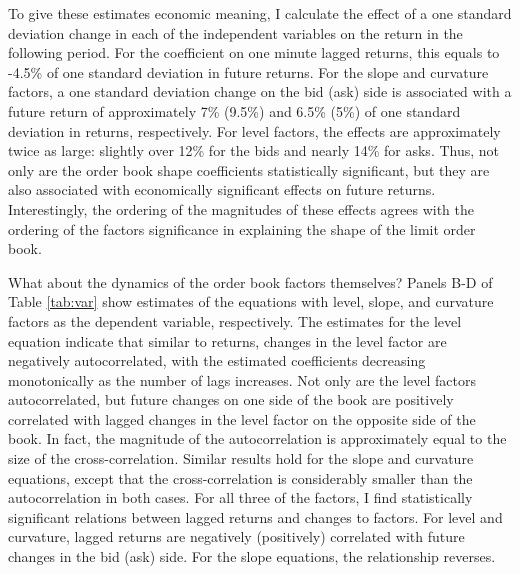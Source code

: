 	To give these estimates economic meaning, I calculate the effect of a one standard deviation change in each of the independent variables on the return in the following period. For the coefficient on one minute lagged returns, this equals to -4.5\% of one standard deviation in future returns. For the slope and curvature factors, a one standard deviation change on the bid (ask) side is associated with a future return of approximately 7\% (9.5\%) and 6.5\% (5\%) of one standard deviation in returns, respectively. For level factors, the effects are approximately twice as large: slightly over 12\% for the bids and nearly 14\% for asks. Thus, not only are the order book shape coefficients statistically significant, but they are also associated with economically significant effects on future returns. Interestingly, the ordering of the magnitudes of these effects agrees with the ordering of the factors significance in explaining the shape of the limit order book.

	What about the dynamics of the order book factors themselves? Panels B-D of Table \ref{tab:var} show estimates of the equations with level, slope, and curvature factors as the dependent variable, respectively. The estimates for the level equation indicate that similar to returns, changes in the level factor are negatively autocorrelated, with the estimated coefficients decreasing monotonically as the number of lags increases. Not only are the level factors autocorrelated, but future changes on one side of the book are positively correlated with lagged changes in the level factor on the opposite side of the book. In fact, the magnitude of the autocorrelation is approximately equal to the size of the cross-correlation. Similar results hold for the slope and curvature equations, except that the cross-correlation is considerably smaller than the autocorrelation in both cases. For all three of the factors, I find statistically significant relations between lagged returns and changes to factors. For level and curvature, lagged returns are negatively (positively) correlated with future changes in the bid (ask) side. For the slope equations, the relationship reverses.

